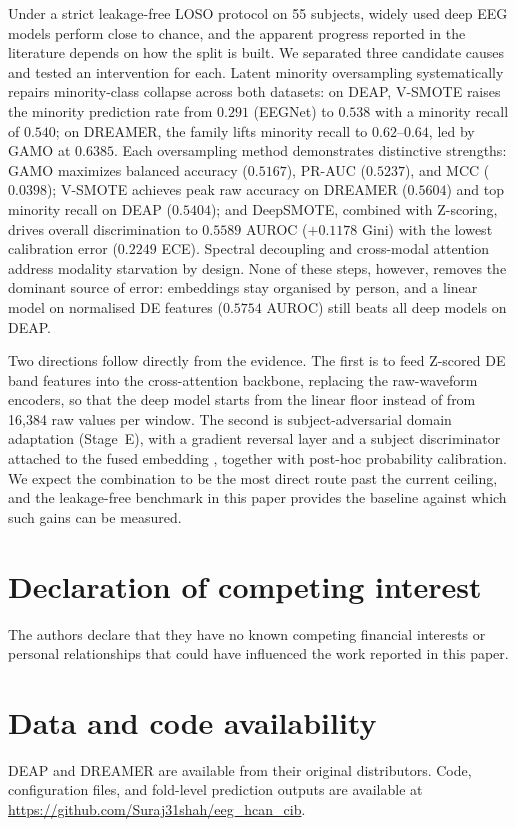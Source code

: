 \documentclass[a4paper,fleqn]{cas-sc}
\begin{document}
Under a strict leakage-free LOSO protocol on 55 subjects, widely used deep EEG models perform close to chance, and the apparent progress reported in the literature depends on how the split is built. We separated three candidate causes and tested an intervention for each. Latent minority oversampling systematically repairs minority-class collapse across both datasets: on DEAP, V-SMOTE raises the minority prediction rate from $0.291$ (EEGNet) to $0.538$ with a minority recall of $0.540$; on DREAMER, the family lifts minority recall to $0.62$--$0.64$, led by GAMO at $0.6385$. Each oversampling method demonstrates distinctive strengths: GAMO maximizes balanced accuracy ($0.5167$), PR-AUC ($0.5237$), and MCC ($0.0398$); V-SMOTE achieves peak raw accuracy on DREAMER ($0.5604$) and top minority recall on DEAP ($0.5404$); and DeepSMOTE, combined with Z-scoring, drives overall discrimination to $0.5589$ AUROC ($+0.1178$ Gini) with the lowest calibration error ($0.2249$ ECE). Spectral decoupling and cross-modal attention address modality starvation by design. None of these steps, however, removes the dominant source of error: embeddings stay organised by person, and a linear model on normalised DE features ($0.5754$ AUROC) still beats all deep models on DEAP.

Two directions follow directly from the evidence. The first is to feed Z-scored DE band features into the cross-attention backbone, replacing the raw-waveform encoders, so that the deep model starts from the linear floor instead of from 16{,}384 raw values per window. The second is subject-adversarial domain adaptation (Stage~E), with a gradient reversal layer and a subject discriminator attached to the fused embedding \citep{wang2023cross,li2021bidann}, together with post-hoc probability calibration. We expect the combination to be the most direct route past the current ceiling, and the leakage-free benchmark in this paper provides the baseline against which such gains can be measured.

\section*{Declaration of competing interest}
The authors declare that they have no known competing financial interests or personal relationships that could have influenced the work reported in this paper.

\section*{Data and code availability}
DEAP and DREAMER are available from their original distributors. Code, configuration files, and fold-level prediction outputs are available at \url{https://github.com/Suraj31shah/eeg_hcan_cib}.
\end{document}
